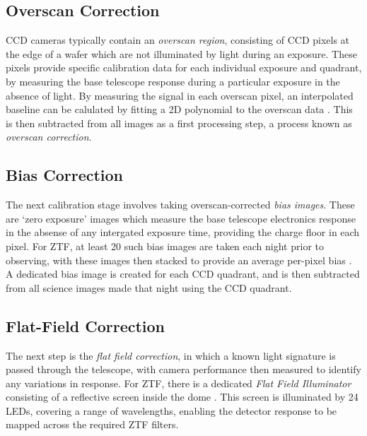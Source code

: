 \subsection*{Overscan Correction}

CCD cameras typically contain an \emph{overscan region}, consisting of CCD pixels at the edge of a wafer which are not illuminated by light during an exposure. These pixels provide specific calibration data for each individual exposure and quadrant, by measuring the base telescope response during a particular exposure in the absence of light. By measuring the signal in each overscan pixel, an interpolated baseline can be calulated by fitting a 2D polynomial to the overscan data \cite{ztf_data_processing}. This is then subtracted from all images as a first processing step, a process known as \emph{overscan correction}. 

\subsection*{Bias Correction}

The next calibration stage involves taking overscan-corrected \emph{bias images}. These are `zero exposure' images which measure the base telescope electronics response in the absense of any intergated exposure time, providing the charge floor in each pixel. For ZTF, at least 20 such bias images are taken each night prior to observing, with these images then stacked to provide an average per-pixel bias \cite{ztf_data_processing}. A dedicated bias image is created for each CCD quadrant, and is then subtracted from all science images made that night using the CCD quadrant.

\subsection*{Flat-Field Correction}

The next step is the \emph{flat field correction}, in which a known light signature is passed through the telescope, with camera performance then measured to identify any variations in response. For ZTF, there is a dedicated \emph{Flat Field Illuminator} consisting of a reflective screen inside the dome \cite{ztf_system}. This screen is illuminated by 24 LEDs, covering a range of wavelengths, enabling the detector response to be mapped across the required ZTF filters. 


